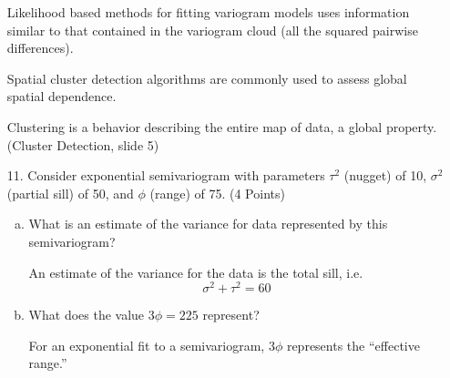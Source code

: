 \documentclass[letterpaper, 12pt]{article}
\begin{document}
\begin{enumerate}
Likelihood based methods for fitting variogram models uses information similar to that contained in the variogram cloud (all the squared pairwise differences).

Spatial cluster detection algorithms are commonly used to assess global spatial dependence.

{\sf
Clustering is a behavior describing the entire map of data, a global property.
(Cluster Detection, slide 5)
}

\item[11.]
Consider exponential semivariogram with parameters $\tau^2$ (nugget) of 10, $\sigma^2$ (partial sill) of 50, and $\phi$ (range) of 75. (4 Points)
\begin{enumerate}[a.]
\item
What is an estimate of the variance for data represented by this semivariogram?

{\sf
An estimate of the variance for the data is the total sill, i.e.
\[
\sigma^2 + \tau^2 = 60
\]
}

\item
What does the value $3\phi=225$ represent?

{\sf
For an exponential fit to a semivariogram, $3\phi$ represents the ``effective range.''
}

\end{enumerate}
\end{enumerate}
\end{document}
